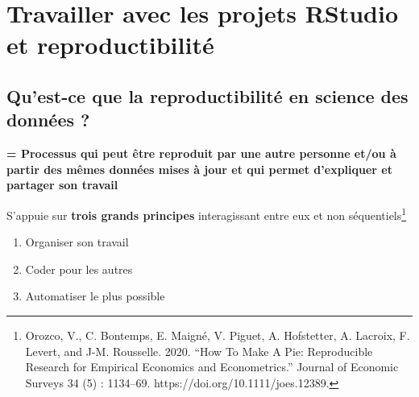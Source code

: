 \documentclass[
  french,
  10pt,
  a4paper,
]{article}
\newenvironment{Shaded}{}{}
\newcommand{\CommentTok}[1]{\textcolor[rgb]{0.63,0.63,0.65}{\textit{#1}}}
\newcommand{\FunctionTok}[1]{\textcolor[rgb]{0.25,0.47,0.95}{#1}}
\newcommand{\NormalTok}[1]{\textcolor[rgb]{0.22,0.23,0.26}{#1}}
\newcommand{\StringTok}[1]{\textcolor[rgb]{0.31,0.63,0.31}{#1}}
\providecommand{\tightlist}{%
  \setlength{\itemsep}{0pt}\setlength{\parskip}{0pt}}
\renewenvironment{verbatim}{\VerbatimEnvironment\begin{Verbatim}[breaklines=true,breakanywhere=true]}{\end{Verbatim}}
\begin{document}

\section{\texorpdfstring{Travailler avec les projets \textbf{RStudio} et
reproductibilité}{Travailler avec les projets RStudio et reproductibilité}}\label{travailler-avec-les-projets-rstudio-et-reproductibilituxe9}

\subsection{Qu'est-ce que la reproductibilité en science des données
?}\label{quest-ce-que-la-reproductibilituxe9-en-science-des-donnuxe9es}

\textbf{= Processus qui peut être reproduit par une autre personne et/ou
à partir des mêmes données mises à jour et qui permet d'expliquer et
partager son travail}

S'appuie sur \textbf{trois grands principes} interagissant entre eux et
non séquentiels\footnote{Orozco, V., C. Bontemps, E. Maigné, V. Piguet,
  A. Hofstetter, A. Lacroix, F. Levert, and J-M. Rousselle. 2020. ``How
  To Make A Pie: Reproducible Research for Empirical Economics and
  Econometrics.'' Journal of Economic Surveys 34 (5) : 1134--69.
  https://doi.org/10.1111/joes.12389.}

\begin{enumerate}
\def\labelenumi{\arabic{enumi}.}
\tightlist
\item
  Organiser son travail
\item
  Coder pour les autres
\item
  Automatiser le plus possible
\end{enumerate}
\end{document}
